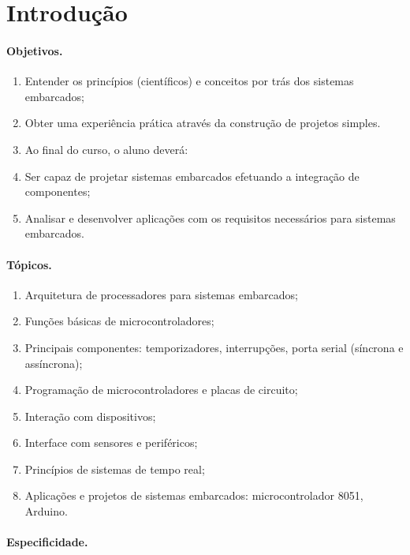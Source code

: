 \section*{Introdução}

\paragraph{Objetivos.}

\begin{enumerate}
\item Entender os princípios (científicos) e conceitos por trás dos sistemas embarcados;
\item Obter uma experiência prática através da construção de projetos simples.
\item Ao final do curso, o aluno deverá:
\item Ser capaz de projetar sistemas embarcados efetuando a integração de componentes;
\item Analisar e desenvolver aplicações com os requisitos necessários para sistemas embarcados.
\end{enumerate}

\paragraph{Tópicos.}

\begin{enumerate}
\item Arquitetura de processadores para sistemas embarcados;
\item Funções básicas de microcontroladores;
\item Principais componentes: temporizadores, interrupções, porta serial (síncrona e assíncrona);
\item Programação de microcontroladores e placas de circuito;
\item Interação com dispositivos;
\item Interface com sensores e periféricos;
\item Princípios de sistemas de tempo real;
\item Aplicações e projetos de sistemas embarcados: microcontrolador 8051, Arduino. 
\end{enumerate}



\paragraph{Especificidade.}

